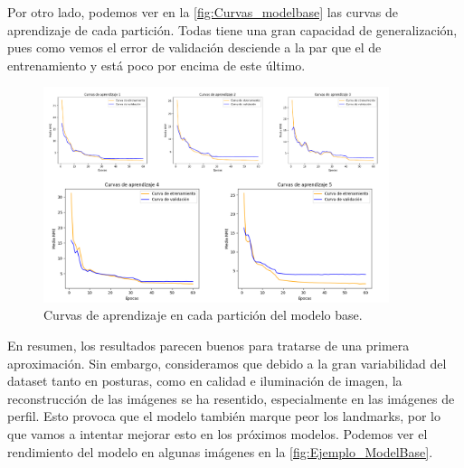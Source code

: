         \medskip

        \noindent Por otro lado, podemos ver en la \autoref{fig:Curvas_modelbase} las curvas de aprendizaje de cada partición. Todas tiene una gran capacidad de generalización, pues como vemos el error de validación desciende a la par que el de entrenamiento y está poco por encima de este último.

        \begin{figure}[H]
            \centering
            \includegraphics[width=0.9\textwidth]{img/curvas_aprendizaje_modelbase.png}
            \caption{Curvas de aprendizaje en cada partición del modelo base.}
            \label{fig:Curvas_modelbase}
        \end{figure}

        \noindent En resumen, los resultados parecen buenos para tratarse de una primera aproximación. Sin embargo, consideramos que debido a la gran variabilidad del dataset tanto en posturas, como en calidad e iluminación de imagen, la reconstrucción de las imágenes se ha resentido, especialmente en las imágenes de perfil. Esto provoca que el modelo también marque peor los landmarks, por lo que vamos a intentar mejorar esto en los próximos modelos. Podemos ver el rendimiento del modelo en algunas imágenes en la \autoref{fig:Ejemplo_ModelBase}.

